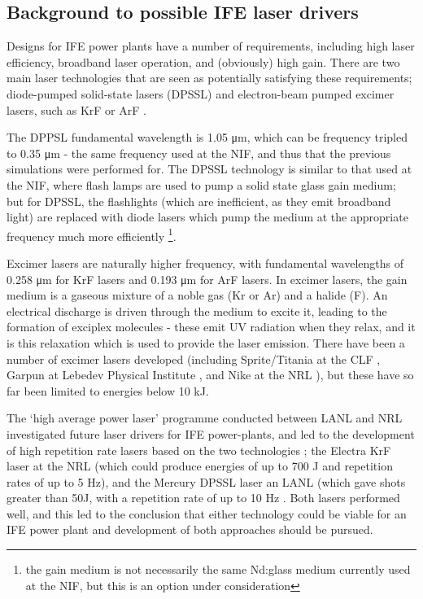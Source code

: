 \subsection{Background to possible IFE laser drivers}

Designs for IFE power plants have a number of requirements, including high laser efficiency, broadband laser operation, and (obviously) high gain. There are two main laser technologies that are seen as potentially satisfying these requirements; diode-pumped solid-state lasers (DPSSL) and electron-beam pumped excimer lasers, such as KrF or ArF \cite{Craxton2015}. 

The DPPSL fundamental wavelength is 1.05 \unit{\micro\meter}, which can be frequency tripled to 0.35 \unit{\micro\meter} - the same frequency used at the NIF, and thus that the previous simulations were performed for. The DPSSL technology is similar to that used at the NIF, where flash lamps are used to pump a solid state glass gain medium; but for DPSSL, the flashlights (which are inefficient, as they emit broadband light) are replaced with diode lasers which pump the medium at the appropriate frequency much more efficiently \footnote{the gain medium is not necessarily the same Nd:glass medium currently used at the NIF, but this is an option under consideration}. 

Excimer lasers are naturally higher frequency, with fundamental wavelengths of 0.258 \unit{\micro\meter} for KrF lasers and 0.193 \unit{\micro\meter} for ArF lasers. In excimer lasers, the gain medium is a gaseous mixture of a noble gas (Kr or Ar) and a halide (F). An electrical discharge is driven through the medium to excite it, leading to the formation of exciplex molecules - these emit UV radiation when they relax, and it is this relaxation which is used to provide the laser emission. There have been a number of excimer lasers developed (including Sprite/Titania at the CLF \cite{Divall1996}, Garpun at Lebedev Physical Institute \cite{Zvorykin2006}, and Nike at the NRL \cite{Obenschain1996}), but these have so far been limited to energies below 10 kJ. 

The `high average power laser' programme conducted between LANL and NRL investigated future laser drivers for IFE power-plants, and led to the development of high repetition rate lasers based on the two technologies \cite{Craxton2015}; the Electra KrF laser at the NRL (which could produce energies of up to 700 J and repetition rates of up to 5 Hz), and the Mercury DPSSL laser an LANL (which gave shots greater than 50J, with a repetition rate of up to 10 Hz \cite{Sethian2010}. Both lasers performed well, and this led to the conclusion that either technology could be viable for an IFE power plant and development of both approaches should be pursued.

